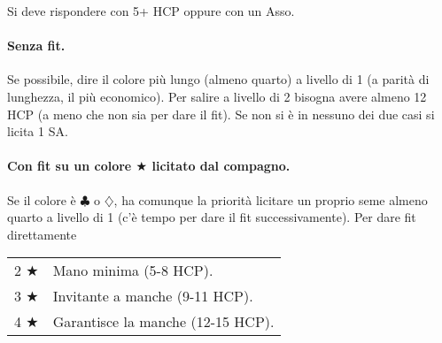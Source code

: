 \documentclass[a4paper,10pt]{article}
\renewcommand{\c}{$\clubsuit$\xspace}
\renewcommand{\d}{$\diamondsuit$\xspace}
\renewcommand{\j}{$\bigstar$\xspace}
\newcommand{\sa}{SA\xspace}
\newcommand{\smallspace}{\vskip0.3cm}
\newenvironment{twocol}
  {\smallspace\noindent\begin{tabular}{l p{0.78\textwidth}}}
  {\end{tabular}\smallspace}
\begin{document}
Si deve rispondere con 5+ HCP oppure con un Asso.

\paragraph{Senza fit.} Se possibile, dire il colore più lungo (almeno quarto) a livello di 1 (a parità di lunghezza, il più economico). Per salire a livello di 2 bisogna avere almeno 12 HCP (a meno che non sia per dare il fit). Se non si è in nessuno dei due casi si licita 1 \sa.%

\paragraph{Con fit su un colore \j licitato dal compagno.} Se il colore è \c o \d, ha comunque la priorità licitare un proprio seme almeno quarto a livello di 1 (c'è tempo per dare il fit successivamente). Per dare fit direttamente
\begin{twocol}
 2 \j & Mano minima (5-8 HCP).\\
 3 \j & Invitante a manche (9-11 HCP).\\
 4 \j & Garantisce la manche (12-15 HCP).\\
\end{twocol}
\end{document}
